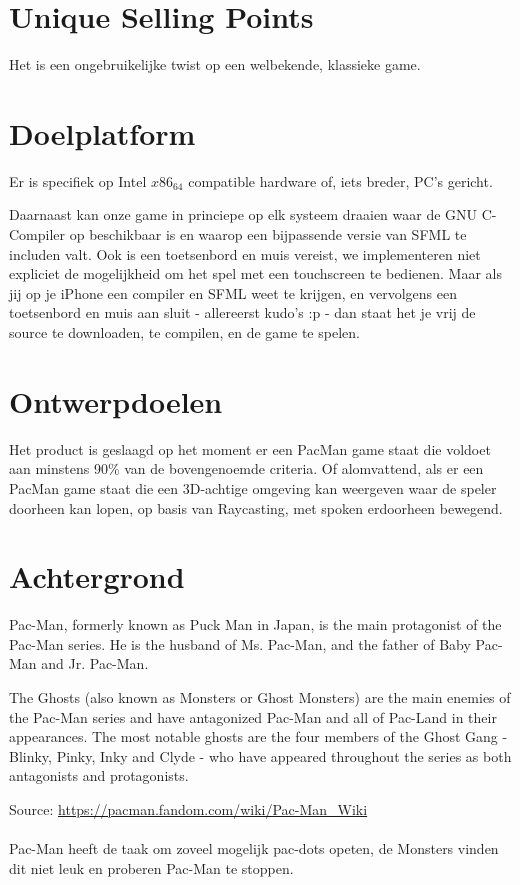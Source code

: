 \documentclass{article}
\begin{document}
\section{Unique Selling Points} %
\label{sec:unique_selling_points}
Het is een ongebruikelijke twist op een welbekende, klassieke game.

\section{Doelplatform} %
\label{sec:doelplatform}
Er is specifiek op Intel $x86_64$ compatible hardware of, iets breder, PC's gericht.

Daarnaast kan onze game in princiepe op elk systeem draaien waar de GNU C-Compiler op beschikbaar is en waarop een bijpassende versie van SFML te includen valt. Ook is een toetsenbord en muis vereist, we implementeren niet expliciet de mogelijkheid om het spel met een touchscreen te bedienen. Maar als jij op je iPhone een compiler en SFML weet te krijgen, en vervolgens een toetsenbord en muis aan sluit - allereerst kudo's :p - dan staat het je vrij de source te downloaden, te compilen, en de game te spelen.

\section{Ontwerpdoelen} %
\label{sec:ontwerpdoelen}
Het product is geslaagd op het moment er een PacMan game staat die voldoet aan minstens 90\% van de bovengenoemde criteria. Of alomvattend, als er een PacMan game staat die een 3D-achtige omgeving kan weergeven waar de speler doorheen kan lopen, op basis van Raycasting, met spoken erdoorheen bewegend.

\section{Achtergrond} %
\label{sec:achtergrond}
\begin{quoting}
    Pac-Man, formerly known as Puck Man in Japan, is the main protagonist of the Pac-Man series. He is the husband of Ms. Pac-Man, and the father of Baby Pac-Man and Jr. Pac-Man.

    The Ghosts (also known as Monsters or Ghost Monsters) are the main enemies of the Pac-Man series and have antagonized Pac-Man and all of Pac-Land in their appearances. The most notable ghosts are the four members of the Ghost Gang - Blinky, Pinky, Inky and Clyde - who have appeared throughout the series as both antagonists and protagonists.
\end{quoting}
\small{Source: \url{https://pacman.fandom.com/wiki/Pac-Man_Wiki}}
\\\\
Pac-Man heeft de taak om zoveel mogelijk pac-dots opeten, de Monsters vinden dit niet leuk en proberen Pac-Man te stoppen.
\end{document}
